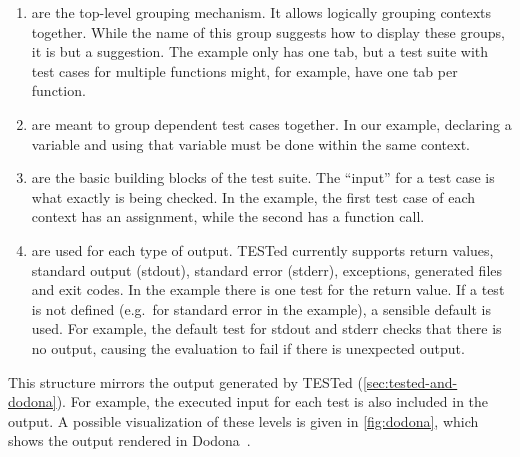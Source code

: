 \documentclass[../main]{subfiles}
\begin{document}
\begin{enumerate}[noitemsep]
    \item {} are the top-level grouping mechanism.
          It allows logically grouping contexts together.
          While the name of this group suggests how to display these groups, it is but a suggestion.
          The example only has one tab, but a test suite with test cases for multiple functions might, for example, have one tab per function.
    \item {} are meant to group dependent test cases together.
          In our example, declaring a variable and using that variable must be done within the same context.
    \item {} are the basic building blocks of the test suite.
          The ``input'' for a test case is what exactly is being checked.
          In the example, the first test case of each context has an assignment, while the second has a function call.
    \item {} are used for each type of output.
          TESTed currently supports return values, standard output (stdout), standard error (stderr), exceptions, generated files and exit codes.
          In the example there is one test for the return value.
          If a test is not defined (e.g.\ for standard error in the example), a sensible default is used.
          For example, the default test for stdout and stderr checks that there is no output, causing the evaluation to fail if there is unexpected output.
\end{enumerate}

This structure mirrors the output generated by TESTed (\cref{sec:tested-and-dodona}).
For example, the executed input for each test is also included in the output.
A possible visualization of these levels is given in \cref{fig:dodona}, which shows the output rendered in Dodona~\autocite{vanpetegemDodonaLearnCode2023}.
\end{document}
